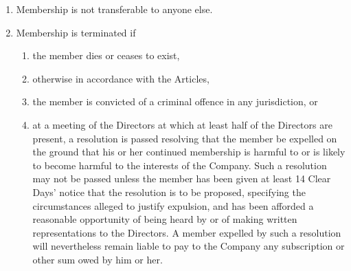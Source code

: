 \documentclass[a4paper,12pt]{article}
\begin{document}
\begin{enumerate}
  \item Membership is not transferable to anyone else. %
  \item Membership is terminated if%
  \begin{enumerate}
    \item the member dies or ceases to exist, %
    \item otherwise in accordance with the Articles, %
    \item the member is convicted of a criminal offence in any jurisdiction, or %
    \item	at a meeting of the Directors at which at least half of the Directors are present, a resolution is passed resolving that the member be expelled on the ground that his or her continued membership is harmful to or is likely to become harmful to the interests of the Company. Such a resolution may not be passed unless the member has been given at least 14 Clear Days’ notice that the resolution is to be proposed, specifying the circumstances alleged to justify expulsion, and has been afforded a reasonable opportunity of being heard by or of making written representations to the Directors. A member expelled by such a resolution will nevertheless remain liable to pay to the Company any subscription or other sum owed by him or her.
  \end{enumerate}
\end{enumerate}

\end{document}
